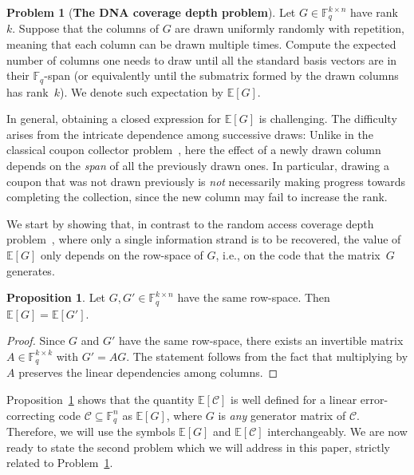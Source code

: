 \documentclass[11pt,a4paper,reqno,twoside]{article}
\theoremstyle{definition}
\newtheorem{proposition}[theorem]{Proposition}
\newtheorem{problem}{Problem}
\newcommand{\F}{\mathbb{F}}
\newcommand{\E}{\mathbb{E}}
\newcommand{\mC}{\mathcal{C}}
\begin{document}
\begin{problem}[\textbf{The DNA coverage depth problem}] \label{first_problem}
    Let $G \in \mathbb{F}_q^{k \times n}$ have rank~$k$. Suppose that the columns of $G$ are drawn uniformly randomly with repetition, meaning that each column can be drawn multiple times. Compute the expected number of columns one needs to draw until all the standard basis vectors are in their $\mathbb{F}_q$-span (or equivalently until the submatrix formed by the drawn columns has rank~$k$). We denote such expectation by $\mathbb{E}[G]$.
\end{problem}


In general, obtaining a closed expression for $\E[G]$ is challenging. 
The difficulty arises from the intricate dependence among successive draws: 
Unlike in the classical coupon collector problem~\cite{ccp1, ccp2, ccp3, ccp4}, here the effect of a newly drawn column depends on the \textit{span} of all the previously drawn ones. In particular, 
drawing a coupon that was not drawn previously is \textit{not} necessarily making progress
towards completing the collection, since the new column may fail to increase the rank. 


We start by showing that, in contrast to the random access coverage depth problem~\cite[Problem~1]{a_combinatorial_perspective}, where only a single information strand is to be recovered, the value of $\E[G]$ only depends on the row-space of $G$, i.e., on the code that the matrix~$G$ generates.

\begin{proposition} \label{independence_from_G_proposition}
    Let $G,G' \in \F_q^{k \times n}$ have the same row-space. Then $\E[G]=\E[G']$.
\end{proposition}
\begin{proof}
Since $G$ and $G'$ have the same row-space, there exists an invertible matrix $A \in \F_q^{k \times k}$ with $G'=AG$. 
The statement follows from the fact that multiplying by $A$ preserves the linear dependencies among columns.
\end{proof}

Proposition~\ref{independence_from_G_proposition} 
shows that the quantity 
$\E[\mC]$ is well defined for a linear error-correcting code $\mC \subseteq \F_q^n$ as $\E[G]$, where $G$ is \textit{any} generator matrix of $\mC$. Therefore, we will use the symbols $\E[G]$ and $\E[\mC]$ interchangeably. We are now ready 
to state the second problem which we will address in this paper, strictly related to Problem~\ref{first_problem}.
\end{document}
